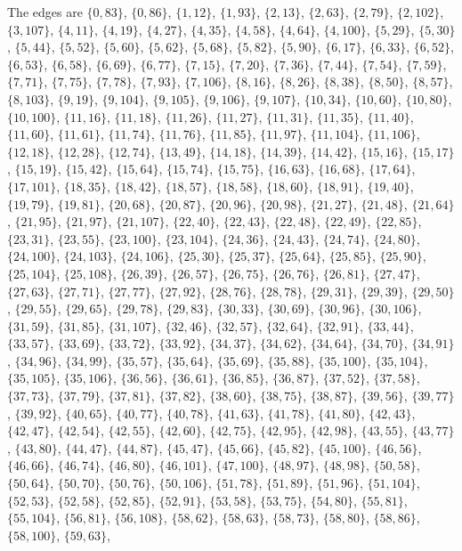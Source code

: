 \documentclass[11pt]{article}
\begin{document}
The edges are $\{0,83\}$, $\{0,86\}$, $\{1,12\}$, $\{1,93\}$, $\{2,13\}$, $\{2,63\}$, $\{2,79\}$, $\{2,102\}$, $\{3,107\}$, $\{4,11\}$, $\{4,19\}$, $\{4,27\}$, $\{4,35\}$, $\{4,58\}$, $\{4,64\}$, $\{4,100\}$, $\{5,29\}$, $\{5,30\}$, $\{5,44\}$, $\{5,52\}$, $\{5,60\}$, $\{5,62\}$, $\{5,68\}$, $\{5,82\}$, $\{5,90\}$, $\{6,17\}$, $\{6,33\}$, $\{6,52\}$, $\{6,53\}$, $\{6,58\}$, $\{6,69\}$, $\{6,77\}$, $\{7,15\}$, $\{7,20\}$, $\{7,36\}$, $\{7,44\}$, $\{7,54\}$, $\{7,59\}$, $\{7,71\}$, $\{7,75\}$, $\{7,78\}$, $\{7,93\}$, $\{7,106\}$, $\{8,16\}$, $\{8,26\}$, $\{8,38\}$, $\{8,50\}$, $\{8,57\}$, $\{8,103\}$, $\{9,19\}$, $\{9,104\}$, $\{9,105\}$, $\{9,106\}$, $\{9,107\}$, $\{10,34\}$, $\{10,60\}$, $\{10,80\}$, $\{10,100\}$, $\{11,16\}$, $\{11,18\}$, $\{11,26\}$, $\{11,27\}$, $\{11,31\}$, $\{11,35\}$, $\{11,40\}$, $\{11,60\}$, $\{11,61\}$, $\{11,74\}$, $\{11,76\}$, $\{11,85\}$, $\{11,97\}$, $\{11,104\}$, $\{11,106\}$, $\{12,18\}$, $\{12,28\}$, $\{12,74\}$, $\{13,49\}$, $\{14,18\}$, $\{14,39\}$, $\{14,42\}$, $\{15,16\}$, $\{15,17\}$, $\{15,19\}$, $\{15,42\}$, $\{15,64\}$, $\{15,74\}$, $\{15,75\}$, $\{16,63\}$, $\{16,68\}$, $\{17,64\}$, $\{17,101\}$, $\{18,35\}$, $\{18,42\}$, $\{18,57\}$, $\{18,58\}$, $\{18,60\}$, $\{18,91\}$, $\{19,40\}$, $\{19,79\}$, $\{19,81\}$, $\{20,68\}$, $\{20,87\}$, $\{20,96\}$, $\{20,98\}$, $\{21,27\}$, $\{21,48\}$, $\{21,64\}$, $\{21,95\}$, $\{21,97\}$, $\{21,107\}$, $\{22,40\}$, $\{22,43\}$, $\{22,48\}$, $\{22,49\}$, $\{22,85\}$, $\{23,31\}$, $\{23,55\}$, $\{23,100\}$, $\{23,104\}$, $\{24,36\}$, $\{24,43\}$, $\{24,74\}$, $\{24,80\}$, $\{24,100\}$, $\{24,103\}$, $\{24,106\}$, $\{25,30\}$, $\{25,37\}$, $\{25,64\}$, $\{25,85\}$, $\{25,90\}$, $\{25,104\}$, $\{25,108\}$, $\{26,39\}$, $\{26,57\}$, $\{26,75\}$, $\{26,76\}$, $\{26,81\}$, $\{27,47\}$, $\{27,63\}$, $\{27,71\}$, $\{27,77\}$, $\{27,92\}$, $\{28,76\}$, $\{28,78\}$, $\{29,31\}$, $\{29,39\}$, $\{29,50\}$, $\{29,55\}$, $\{29,65\}$, $\{29,78\}$, $\{29,83\}$, $\{30,33\}$, $\{30,69\}$, $\{30,96\}$, $\{30,106\}$, $\{31,59\}$, $\{31,85\}$, $\{31,107\}$, $\{32,46\}$, $\{32,57\}$, $\{32,64\}$, $\{32,91\}$, $\{33,44\}$, $\{33,57\}$, $\{33,69\}$, $\{33,72\}$, $\{33,92\}$, $\{34,37\}$, $\{34,62\}$, $\{34,64\}$, $\{34,70\}$, $\{34,91\}$, $\{34,96\}$, $\{34,99\}$, $\{35,57\}$, $\{35,64\}$, $\{35,69\}$, $\{35,88\}$, $\{35,100\}$, $\{35,104\}$, $\{35,105\}$, $\{35,106\}$, $\{36,56\}$, $\{36,61\}$, $\{36,85\}$, $\{36,87\}$, $\{37,52\}$, $\{37,58\}$, $\{37,73\}$, $\{37,79\}$, $\{37,81\}$, $\{37,82\}$, $\{38,60\}$, $\{38,75\}$, $\{38,87\}$, $\{39,56\}$, $\{39,77\}$, $\{39,92\}$, $\{40,65\}$, $\{40,77\}$, $\{40,78\}$, $\{41,63\}$, $\{41,78\}$, $\{41,80\}$, $\{42,43\}$, $\{42,47\}$, $\{42,54\}$, $\{42,55\}$, $\{42,60\}$, $\{42,75\}$, $\{42,95\}$, $\{42,98\}$, $\{43,55\}$, $\{43,77\}$, $\{43,80\}$, $\{44,47\}$, $\{44,87\}$, $\{45,47\}$, $\{45,66\}$, $\{45,82\}$, $\{45,100\}$, $\{46,56\}$, $\{46,66\}$, $\{46,74\}$, $\{46,80\}$, $\{46,101\}$, $\{47,100\}$, $\{48,97\}$, $\{48,98\}$, $\{50,58\}$, $\{50,64\}$, $\{50,70\}$, $\{50,76\}$, $\{50,106\}$, $\{51,78\}$, $\{51,89\}$, $\{51,96\}$, $\{51,104\}$, $\{52,53\}$, $\{52,58\}$, $\{52,85\}$, $\{52,91\}$, $\{53,58\}$, $\{53,75\}$, $\{54,80\}$, $\{55,81\}$, $\{55,104\}$, $\{56,81\}$, $\{56,108\}$, $\{58,62\}$, $\{58,63\}$, $\{58,73\}$, $\{58,80\}$, $\{58,86\}$, $\{58,100\}$, $\{59,63\}$, 
\end{document}
